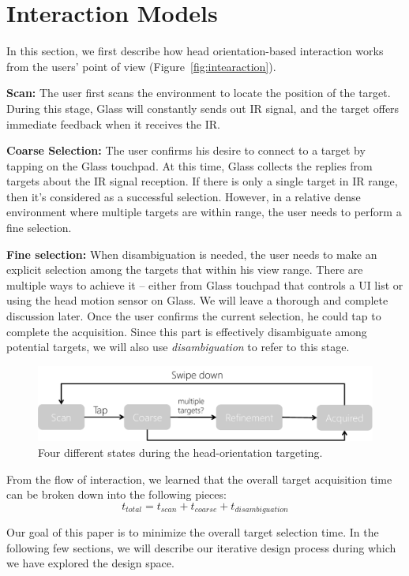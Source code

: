 
\section{Interaction Models}

In this section, we first describe how head orientation-based interaction works from the users' point of view (Figure~\ref{fig:intearaction}).

{\bf Scan:} The user first scans the environment to locate the position of the target. During this stage, Glass will constantly sends out IR signal, and the target offers immediate feedback when it receives the IR. 

{\bf Coarse Selection:} The user confirms his desire to connect to a target by tapping on the Glass touchpad. At this time, Glass collects the replies from targets about the IR signal reception. If there is only a single target in IR range, then it's considered as a successful selection. However, in a relative dense environment where multiple targets are within range, the user needs to perform a fine selection.

{\bf Fine selection:} When disambiguation is needed, the user needs to make an explicit selection among the targets that within his view range. There are multiple ways to achieve it -- either from Glass touchpad that controls a UI list or using the head motion sensor on Glass. We will leave a thorough and complete discussion later. Once the user confirms the current selection, he could tap to complete the acquisition. Since this part is effectively disambiguate among potential targets, we will also use {\em disambiguation} to refer to this stage.

\begin{figure}[t!]
\centering
\includegraphics[width=\columnwidth]{figures/interactionModel.pdf}
\caption{Four different states during the head-orientation targeting.}
\label{fig:interaction}
\end{figure}

From the flow of interaction, we learned that the overall target acquisition time can be broken down into the following pieces:
\begin{equation}
t_{total}=t_{scan}+t_{coarse}+t_{disambiguation}
\end{equation}

Our goal of this paper is to minimize the overall target selection time. In the following few sections, we will describe our iterative design process during which we have explored the design space. 

